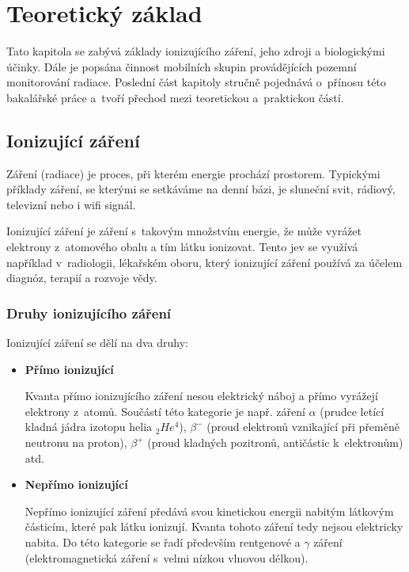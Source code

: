 \chapter{Teoretický základ}
\label{2-teorie} Tato kapitola se zabývá základy ionizujícího záření,
jeho zdroji a biologickými účinky. Dále je popsána činnost mobilních
skupin provádějících pozemní monitorování radiace. Poslední část
kapitoly stručně pojednává o~přínosu této bakalářské práce a~tvoří
přechod mezi teoretickou a~praktickou částí.

\section{Ionizující záření}
	
Záření (radiace) je proces, při kterém energie prochází
prostorem. Typickými pří\-klady záření, se kterými se setkáváme na denní
bázi, je sluneční svit, rádiový, televizní nebo i wifi signál.

Ionizující záření je záření s~takovým množstvím energie, že může
vyrážet elektrony z~atomového obalu a tím látku ionizovat. Tento jev
se využívá například v~radiologii, lékařském oboru, který ionizující
záření používá za účelem diagnóz, terapií a rozvoje vědy. \citep{who}

\subsection{Druhy ionizujícího záření} Ionizující záření se dělí na
dva druhy: \cite{ionZarUllman} \cite{CEZ}

\begin{itemize}
	\item \textbf{Přímo ionizující}
	
		Kvanta přímo ionizujícího záření nesou elektrický
náboj a přímo vyrážejí elektrony z~atomů. Součástí této kategorie je
např. záření $\alpha$ (prudce letící kladná jádra izotopu helia
$_{2}He^{4}$), $\beta^{-}$ (proud elektronů vznikající při přeměně
neutronu na proton), $\beta^{+}$ (proud kladných pozitronů, antičástic
k~elektronům) atd.
		 
	\item \textbf{Nepřímo ionizující}
	
		Nepřímo ionizující záření předává svou kinetickou
energii nabitým látkovým částicím, které pak látku ionizují. Kvanta
tohoto záření tedy nejsou elektricky nabita. Do této kategorie se řadí
především rentgenové a $\gamma$ záření (elektromagnetická záření
s~velmi nízkou vlnovou délkou).
\end{itemize}


